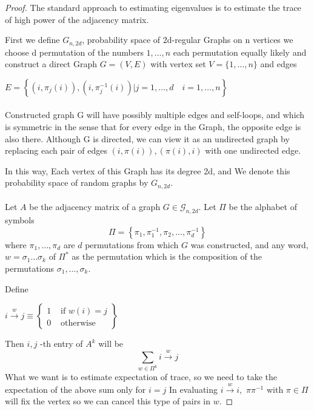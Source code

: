 \documentclass[oneside]{book}
\begin{document}
	\begin{proof}
		The standard approach to estimating eigenvalues is to estimate the trace of high power of the adjacency matrix.\par
		First we define ${G}_{n, 2d}$, probability space of 2d-regular Graphs on n vertices    we choose d permutation of the numbers ${1,\ldots , n}$ each permutation equally likely and construct a direct Graph $G = (V,E) $ with  vertex set $V=\{1, \ldots, n\}$ and edges\par
		$E=\left\{\left(i, \pi_{j}(i)\right),\left(i, \pi_{j}^{-1}(i)\right) | j=1, \ldots, d \quad i=1, \ldots, n\right\}$ \\\\
		Constructed graph G will have possibly multiple edges and self-loops, and which is symmetric in the sense that for every edge in the Graph, the opposite edge is also there. Although G is directed, we can view it as an undirected graph by
		replacing each pair of edges $(i, \pi(i)), (\pi(i), i) $ with one undirected edge.\par In this way, Each vertex of this Graph has its degree 2d, and  We denote
		this probability space of random graphs by $G_{n,2d}$. \\\\
		Let $A$ be the adjacency matrix of a graph $G \in \mathscr{G}_{n, 2 d}$. Let $\Pi$ be the alphabet of symbols
		$$
		\Pi=\left\{\pi_{1}, \pi_{1}^{-1}, \pi_{2}, \ldots, \pi_{d}^{-1}\right\}
		$$
		where  $\pi_{1}, \ldots, \pi_{d}$ are  $d$ permutations from which $G$ was constructed, and any word, $w=\sigma_{1} \ldots \sigma_{k}$ of $\Pi^{*}$ as the permutation which is the composition of the permutations $\sigma_{1}, \ldots, \sigma_{k} .$ \par
		Define  \begin{center}
			$i \stackrel{w}{\rightarrow} j \equiv\left\{\begin{array}{ll}
			1 & \text { if  }  w(i)=j \\
			0 & \text { otherwise }
			\end{array}\right\}$ 
		\end{center}
		Then  $i, j$ -th entry of $A^{k}$ will be 
		$$
		\sum_{w \in \Pi^{k}} i \stackrel{w}{\rightarrow} j
		$$
		What we want is  to estimate expectation of  trace, so we need to take the expectation of the above sum only for  $i = j$      
		In evaluating $i \stackrel{w}{\rightarrow} i,$  $\pi \pi^{-1}$ with $\pi \in \Pi $    will fix the vertex so we can cancel this type of pairs in  $w$.\par

\end{proof}
\end{document}
